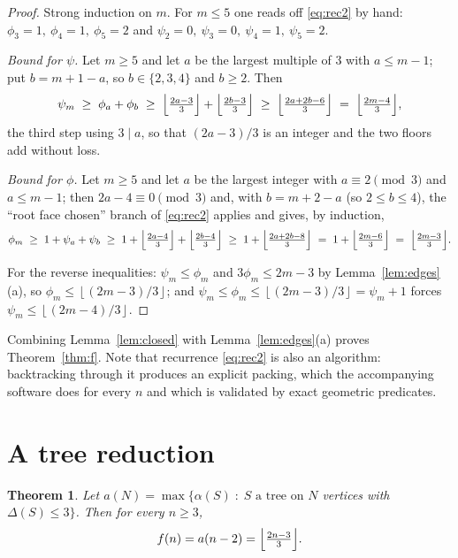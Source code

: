 \documentclass[11pt]{article}
\theoremstyle{plain}
\newtheorem{theorem}{Theorem}[section]
\theoremstyle{definition}
\theoremstyle{remark}
\newcommand{\Floor}[1]{\left\lfloor #1\right\rfloor}
\begin{document}
\begin{proof}
Strong induction on $m$.  For $m\le 5$ one reads off \eqref{eq:rec2} by hand:
$\phi_3=1,\ \phi_4=1,\ \phi_5=2$ and $\psi_2=0,\ \psi_3=0,\ \psi_4=1,\ \psi_5=2$.

\emph{Bound for $\psi$.} Let $m\ge 5$ and let $a$ be the largest multiple of $3$ with
$a\le m-1$; put $b=m+1-a$, so $b\in\{2,3,4\}$ and $b\ge 2$.  Then
\begin{equation*}
\psi_m\;\ge\;\phi_a+\phi_b\;\ge\;
\Bigl\lfloor\tfrac{2a-3}{3}\Bigr\rfloor+\Bigl\lfloor\tfrac{2b-3}{3}\Bigr\rfloor
\;\ge\;\Bigl\lfloor\tfrac{2a+2b-6}{3}\Bigr\rfloor
\;=\;\Bigl\lfloor\tfrac{2m-4}{3}\Bigr\rfloor,
\end{equation*}
the third step using $3\mid a$, so that $(2a-3)/3$ is an integer and the two floors add
without loss.

\emph{Bound for $\phi$.} Let $m\ge 5$ and let $a$ be the largest integer with
$a\equiv 2\pmod 3$ and $a\le m-1$; then $2a-4\equiv 0 \pmod 3$ and, with
$b=m+2-a$ (so $2\le b\le 4$), the ``root face chosen'' branch of \eqref{eq:rec2} applies and
gives, by induction,
\begin{equation*}
\phi_m\;\ge\;1+\psi_a+\psi_b\;\ge\;
1+\Bigl\lfloor\tfrac{2a-4}{3}\Bigr\rfloor+\Bigl\lfloor\tfrac{2b-4}{3}\Bigr\rfloor
\;\ge\;1+\Bigl\lfloor\tfrac{2a+2b-8}{3}\Bigr\rfloor
\;=\;1+\Bigl\lfloor\tfrac{2m-6}{3}\Bigr\rfloor
\;=\;\Bigl\lfloor\tfrac{2m-3}{3}\Bigr\rfloor .
\end{equation*}

For the reverse inequalities: $\psi_m\le\phi_m$ and
$3\phi_m\le 2m-3$ by Lemma~\ref{lem:edges}(a), so $\phi_m\le\Floor{(2m-3)/3}$; and
$\psi_m\le\phi_m\le\Floor{(2m-3)/3}=\psi_m+1$ forces $\psi_m\le\Floor{(2m-4)/3}$.
\end{proof}

Combining Lemma~\ref{lem:closed} with Lemma~\ref{lem:edges}(a) proves
Theorem~\ref{thm:f}.  Note that recurrence \eqref{eq:rec2} is also an algorithm:
backtracking through it produces an explicit packing, which the accompanying software does
for every $n$ and which is validated by exact geometric predicates.

\section{A tree reduction}

\begin{theorem}\label{thm:a}
Let $a(N)=\max\{\alpha(S)\;:\;S\text{ a tree on }N$ vertices with $\Delta(S)\le 3\}$.
Then for every $n\ge 3$,
\[
f(n)=a(n-2)=\Bigl\lfloor\tfrac{2n-3}{3}\Bigr\rfloor .
\]
\end{theorem}
\end{document}
